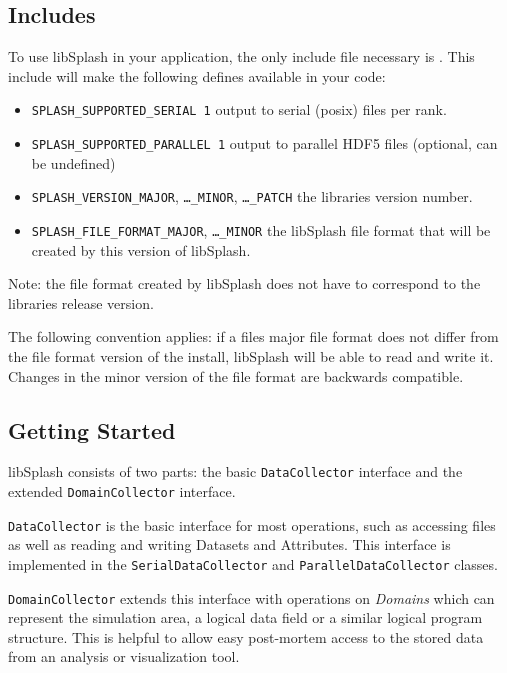\documentclass[a4paper,10pt,BCOR12mm]{report}
\newcommand{\code}[1]{\small \texttt{#1}}
\begin{document}
\subsection{Includes}

To use libSplash in your application, the only include file necessary is\newline
{} .
This include will make the following defines available in your code:
\begin{itemize}
    \item \code{SPLASH\_SUPPORTED\_SERIAL 1} output to serial (posix) files per rank.
    \item \code{SPLASH\_SUPPORTED\_PARALLEL 1} output to parallel HDF5 files
          (optional, can be undefined)
    \item \code{SPLASH\_VERSION\_MAJOR}, \code{\dots\_MINOR}, \code{\dots\_PATCH}
          the libraries version number.
    \item \code{SPLASH\_FILE\_FORMAT\_MAJOR}, \code{\dots\_MINOR} the libSplash file
          format that will be created by this version of libSplash.
\end{itemize}

Note: the file format created by libSplash does not have to correspond to the libraries
release version.

The following convention applies: if a files major file format does not differ from the
file format version of the install, libSplash will be able to read and write it.
Changes in the minor version of the file format are backwards compatible.

\subsection{Getting Started}

libSplash consists of two parts: the basic \code{DataCollector} interface and the extended \code{DomainCollector} interface.

\code{DataCollector} is the basic interface for most operations, such as accessing files as well as reading
and writing Datasets and Attributes.
This interface is implemented in the \code{SerialDataCollector} and \code{ParallelDataCollector} classes.

\code{DomainCollector} extends this interface with operations on \emph{Domains} which can represent the simulation area,
a logical data field or a similar logical program structure.
This is helpful to allow easy post-mortem access to the stored data from an analysis or visualization tool.
\end{document}
